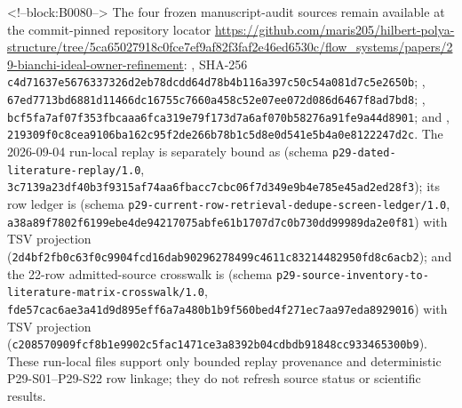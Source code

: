 \documentclass[11pt,a4paper]{article}
\begin{document}
<!--block:B0080-->
The four frozen manuscript-audit sources remain available at the commit-pinned repository locator \url{https://github.com/maris205/hilbert-polya-structure/tree/5ca65027918c0fce7ef9af82f3faf2e46ed6530c/flow_systems/papers/29-bianchi-ideal-owner-refinement}: , SHA-256 \texttt{c4d71637\allowbreak{}e5676337\allowbreak{}326d2eb7\allowbreak{}8dcdd64d\allowbreak{}78b4b116\allowbreak{}a397c50c\allowbreak{}54a081d7\allowbreak{}c5e2650b}; , \texttt{67ed7713\allowbreak{}bd6881d1\allowbreak{}1466dc16\allowbreak{}755c7660\allowbreak{}a458c52e\allowbreak{}07ee072d\allowbreak{}086d6467\allowbreak{}f8ad7bd8}; , \texttt{bcf5fa7a\allowbreak{}f07f353f\allowbreak{}bcaaa6fc\allowbreak{}a319e79f\allowbreak{}173d7a6a\allowbreak{}f070b582\allowbreak{}76a91fe9\allowbreak{}a44d8901}; and , \texttt{219309f0\allowbreak{}c8cea910\allowbreak{}6ba162c9\allowbreak{}5f2de266\allowbreak{}b78b1c5d\allowbreak{}8e0d541e\allowbreak{}5b4a0e81\allowbreak{}22247d2c}. The 2026-09-04 run-local replay is separately bound as  (schema \texttt{p29-dated-literature-replay/1.0}, \texttt{3c7139a2\allowbreak{}3df40b3f\allowbreak{}9315af74\allowbreak{}aa6fbacc\allowbreak{}7cbc06f7\allowbreak{}d349e9b4\allowbreak{}e785e45a\allowbreak{}d2ed28f3}); its row ledger is  (schema \texttt{p29-current-row-retrieval-dedupe-screen-ledger/1.0}, \texttt{a38a89f7\allowbreak{}802f6199\allowbreak{}ebe4de94\allowbreak{}217075ab\allowbreak{}fe61b170\allowbreak{}7d7c0b73\allowbreak{}0dd99989\allowbreak{}da2e0f81}) with TSV projection  (\texttt{2d4bf2fb\allowbreak{}0c63f0c9\allowbreak{}904fcd16\allowbreak{}dab90296\allowbreak{}278499c4\allowbreak{}611c8321\allowbreak{}4482950f\allowbreak{}d8c6acb2}); and the 22-row admitted-source crosswalk is  (schema \texttt{p29-source-inventory-to-literature-matrix-crosswalk/1.0}, \texttt{fde57cac\allowbreak{}6ae3a41d\allowbreak{}9d895eff\allowbreak{}6a7a480b\allowbreak{}1b9f560b\allowbreak{}ed4f271e\allowbreak{}c7aa97ed\allowbreak{}a8929016}) with TSV projection  (\texttt{c2085709\allowbreak{}09fcf8b1\allowbreak{}e9902c5f\allowbreak{}ac1471ce\allowbreak{}3a8392b0\allowbreak{}4cdbdb91\allowbreak{}848cc933\allowbreak{}465300b9}). These run-local files support only bounded replay provenance and deterministic P29-S01--P29-S22 row linkage; they do not refresh source status or scientific results.
\end{document}
